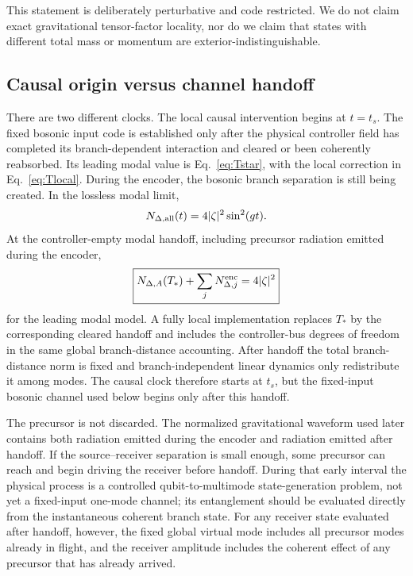 This statement is deliberately perturbative and code restricted. We do not claim exact gravitational tensor-factor locality, nor do we claim that states with different total mass or momentum are exterior-indistinguishable.

\subsection{Causal origin versus channel handoff}

There are two different clocks. The local causal intervention begins at $t=t_s$. The fixed bosonic input code is established only after the physical controller field has completed its branch-dependent interaction and cleared or been coherently reabsorbed. Its leading modal value is Eq.~\eqref{eq:Tstar}, with the local correction in Eq.~\eqref{eq:Tlocal}. During the encoder, the bosonic branch separation is still being created. In the lossless modal limit,
\begin{equation}
N_{\Delta,{\rm all}}(t)=4|\zeta|^2\sin^2(gt).
\end{equation}
At the controller-empty modal handoff, including precursor radiation emitted during the encoder,
\begin{equation}
\boxed{
N_{\Delta,A}(T_*)+
\sum_jN_{\Delta,j}^{\rm enc}=4|\zeta|^2}
\label{eq:distance-conservation}
\end{equation}
for the leading modal model. A fully local implementation replaces $T_*$ by the corresponding cleared handoff and includes the controller-bus degrees of freedom in the same global branch-distance accounting. After handoff the total branch-distance norm is fixed and branch-independent linear dynamics only redistribute it among modes. The causal clock therefore starts at $t_s$, but the fixed-input bosonic channel used below begins only after this handoff.

The precursor is not discarded. The normalized gravitational waveform used later contains both radiation emitted during the encoder and radiation emitted after handoff. If the source--receiver separation is small enough, some precursor can reach and begin driving the receiver before handoff. During that early interval the physical process is a controlled qubit-to-multimode state-generation problem, not yet a fixed-input one-mode channel; its entanglement should be evaluated directly from the instantaneous coherent branch state. For any receiver state evaluated after handoff, however, the fixed global virtual mode includes all precursor modes already in flight, and the receiver amplitude includes the coherent effect of any precursor that has already arrived.

